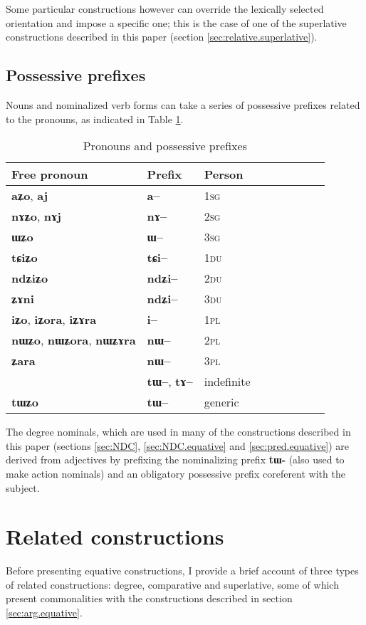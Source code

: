 \documentclass[oneside,a4paper,11pt]{article}
\newcommand{\ipa}[1]{{\phon\textbf{#1}}} %
\begin{document}
Some particular constructions however can override the lexically selected orientation and impose a specific one; this is the case of one of the superlative constructions described in this paper (section \ref{sec:relative.superlative}).

\subsection{Possessive prefixes} \label{sec:possessive}
Nouns and nominalized verb forms can take a series of possessive prefixes related to the pronouns, as indicated in Table \ref{tab:pronoun}. 


\begin{table}[H] \centering
\caption{Pronouns and possessive prefixes }\label{tab:pronoun}
\begin{tabular}{lllllllll} 
\toprule
 Free pronoun & Prefix & Person\\
\midrule
 \ipa{aʑo},    \ipa{aj} &	\ipa{a--}  &		1\textsc{sg} \\
\ipa{nɤʑo},  \ipa{nɤj} &	\ipa{nɤ--}  &			2\textsc{sg}\\
\ipa{ɯʑo}  &	\ipa{ɯ--}  &			3\textsc{sg}\\
\midrule
\ipa{tɕiʑo}  &	\ipa{tɕi--}  &			1\textsc{du} \\
\ipa{ndʑiʑo}  &	\ipa{ndʑi--}  &		2\textsc{du} \\	
\ipa{ʑɤni}  &	\ipa{ndʑi--}  &		3\textsc{du} \\	
\midrule
\ipa{iʑo}, \ipa{iʑora},   \ipa{iʑɤra}   &	\ipa{i--}  &			1\textsc{pl} \\
\ipa{nɯʑo}, \ipa{nɯʑora},   \ipa{nɯʑɤra}  &	\ipa{nɯ--}  &			2\textsc{pl} \\
\ipa{ʑara}  &	\ipa{nɯ--}  &			3\textsc{pl} \\
\midrule
&  \ipa{tɯ--},  \ipa{tɤ--} & indefinite \\
\ipa{tɯʑo} & \ipa{tɯ--}   &  generic\\
\bottomrule
\end{tabular}
\end{table}

The degree nominals, which are used in many of the constructions described in this paper (sections \ref{sec:NDC}, \ref{sec:NDC.equative} and \ref{sec:pred.equative}) are derived from adjectives by prefixing the nominalizing prefix \ipa{tɯ-} (also used to make action nominals) and an obligatory possessive prefix coreferent with the subject.

\section{Related constructions}
Before presenting equative constructions, I provide a brief account of three types of related constructions: degree, comparative and superlative, some of which present commonalities with the constructions described in section \ref{sec:arg.equative}.
\end{document}
